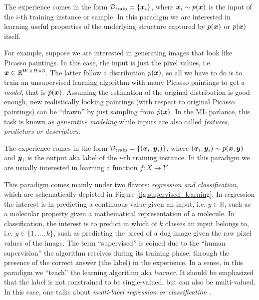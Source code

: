 \begin{definition}[name=Unsupervised learning]
	The experience comes in the form $\mathcal{D}_\text{train} = \{\boldsymbol{x}_i\}$, where $\boldsymbol{x}_i \sim
	p(\boldsymbol{x})$ is the input of the $i$-th training
	instance or sample. In this
	paradigm we are interested in learning useful properties of the underlying
	structure captured by $p(\boldsymbol{x})$ or $p(\boldsymbol{x})$ itself.
\end{definition}

For example, suppose we are interested in generating images that look like
Picasso paintings. In this case, the input is just the pixel values, i.e.  $\boldsymbol{x}
\in \mathbb{R}^{W \times H \times 3}$. The latter follow a distribution
$p(\boldsymbol{x})$, so all we have to do is to train an unsupervised learning algorithm
with many Picasso paintings to get a \emph{model}, that is $\hat{p}(\boldsymbol{x})$.
Assuming the estimation of the original distribution is good enough, new
realistically looking paintings (with respect to original Picasso paintings) can
be ``drawn'' by just sampling from $\hat{p}(\boldsymbol{x})$. In the ML parlance, this
task is known as \emph{generative modeling} while
inputs are also called \emph{features, predictors or
descriptors}.

\begin{definition}[name=Supervised learning]
	The experience comes in the form $\mathcal{D}_\text{train} = \{(\boldsymbol{x}_i, \boldsymbol{y}_i)\}$, where
	$(\boldsymbol{x}_i, \boldsymbol{y}_i) \sim p(\boldsymbol{x}, \boldsymbol{y})$ and $\boldsymbol{y}_i$ is the
	output aka label of the $i$-th training instance.
	In this paradigm we are usually interested in learning a function $f \colon
	X \to Y$.
\end{definition}

This paradigm comes mainly under two flavors: \emph{regression
and classification}, which are schematically depicted in
Figure \ref{fig:supervised_learning}. In regression the interest is in
predicting a continuous value given an input, i.e.  $y \in \mathbb{R}$, such as
a molecular property given a mathematical representation of a molecule. In
classification, the interest is to predict in which of $k$ classes an input
belongs to, i.e. $y \in \{1, \ldots, k\}$, such as predicting the breed of a dog
image given the raw pixel values of the image. The term ``supervised'' is coined
due to the ``human supervision'' the algorithm receives during its training
phase, through the presence of the correct answer (the
label) in the experience.  In a sense, in this paradigm we ``teach'' the
learning algorithm aka \emph{learner}. It should be emphasized that the label is
not constrained to be single-valued, but can also be multi-valued. In this case,
one talks about \emph{multi-label regression or
classification} \parencite{Read_2009}.


